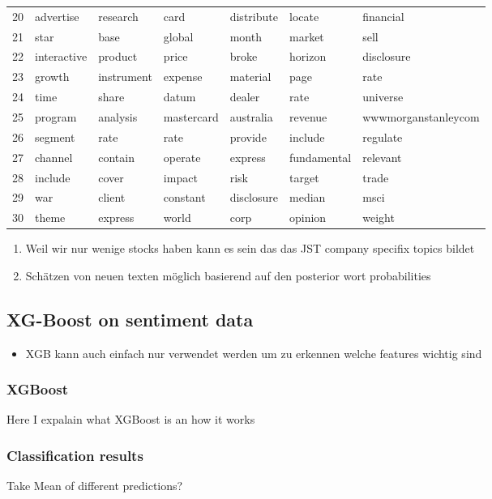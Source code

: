 \begin{table}[ht]
\begin{tabular}{rllllll}
  20 & advertise & research & card & distribute & locate & financial \\ 
  21 & star & base & global & month & market & sell \\ 
  22 & interactive & product & price & broke & horizon & disclosure \\ 
  23 & growth & instrument & expense & material & page & rate \\ 
  24 & time & share & datum & dealer & rate & universe \\ 
  25 & program & analysis & mastercard & australia & revenue & wwwmorganstanleycom \\ 
  26 & segment & rate & rate & provide & include & regulate \\ 
  27 & channel & contain & operate & express & fundamental & relevant \\ 
  28 & include & cover & impact & risk & target & trade \\ 
  29 & war & client & constant & disclosure & median & msci \\ 
  30 & theme & express & world & corp & opinion & weight \\ 
   \hline
\end{tabular}
\end{table}

\begin{enumerate}
    \item Weil wir nur wenige stocks haben kann es sein das das JST company specifix topics bildet
    \item Schätzen von neuen texten möglich basierend auf den posterior wort probabilities
\end{enumerate}
\subsection{XG-Boost on sentiment data}
\begin{itemize}
    \item XGB kann auch einfach nur verwendet werden um zu erkennen welche features wichtig sind
\end{itemize}
\subsubsection{XGBoost}
Here I expalain what XGBoost is an how it works

\subsubsection{Classification results}
Take Mean of different predictions?

